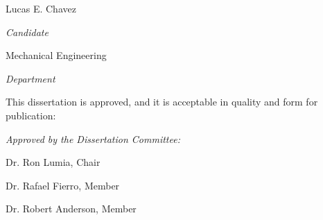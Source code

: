 \documentclass[letterpaper,10pt]{article}
\begin{document}
\vspace{0.8in}
\begin{Large}
 \noindent Lucas E. Chavez
 \end{Large}

 \noindent\makebox[\linewidth][l]{\rule{3.9in}{1pt}}
  \textit{Candidate} \vspace{0.5in}

 \begin{Large}
 \noindent Mechanical Engineering
 \end{Large}

  \noindent\makebox[\linewidth][l]{\rule{3.9in}{1pt}}
    \textit{Department} \vspace{0.4in}




   \noindent This dissertation is approved, and it is acceptable in quality and form for publication: \vspace{0.2in}
\begin{large}
 \noindent \textit{Approved by the Dissertation Committee:} \vspace{1in}
 \end{large}

%
%
%



 \noindent\makebox[\linewidth]{\rule{5.5in}{1pt}}

 Dr. Ron Lumia, Chair \vfill



 \noindent\makebox[\linewidth]{\rule{5.5in}{1pt}}

 Dr. Rafael Fierro, Member  \vfill



   \noindent\makebox[\linewidth]{\rule{5.5in}{1pt}}

 Dr. Robert Anderson, Member  \vfill
\end{document}
